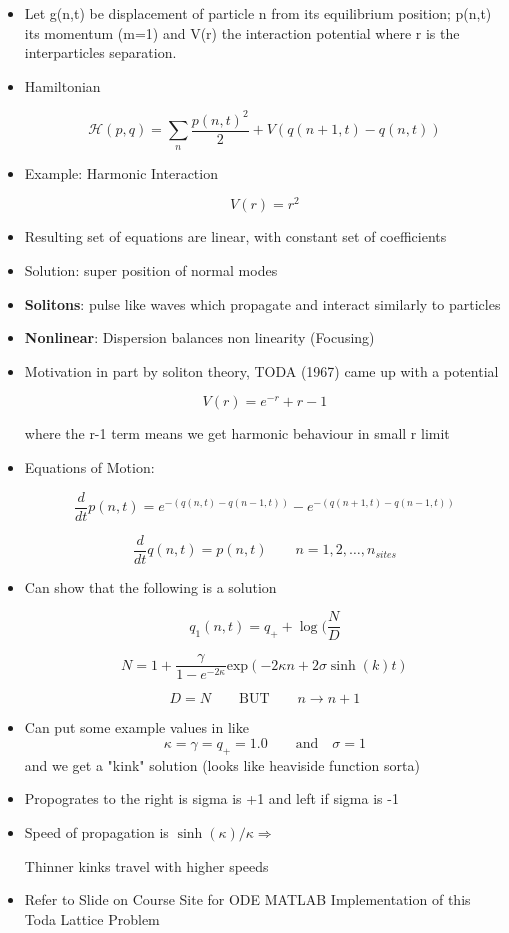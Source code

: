 \begin{itemize}
    \item Let g(n,t) be displacement of particle n from its equilibrium position; p(n,t) its momentum (m=1) and V(r) the interaction potential where r is the interparticles separation.

    \item Hamiltonian

    \[ \mathcal{H} (p,q) = \sum_n \frac{p(n,t)^2}{2} + V(q(n+1,t)-q(n,t))\]

    \item Example: Harmonic Interaction

    \[ V(r) = r^2\]

    \item Resulting set of equations are linear, with constant set of coefficients

    \item Solution: super position of normal modes

    \item \textbf{Solitons}: pulse like waves which propagate and interact similarly to particles
    \item \textbf{Nonlinear}: Dispersion balances non linearity (Focusing)
    \item Motivation in part by soliton theory, TODA (1967) came up with a potential 

    \[ V(r) = e^{-r} + r-1\]

    where the r-1 term means we get harmonic behaviour in small r limit

    \item Equations of Motion:

    \[ \frac{d}{dt} p(n,t) = e^{-(q(n,t)-q(n-1,t))}-e^{-(q(n+1,t)-q(n-1,t))}\]

    \[ \frac{d}{dt} q(n,t) = p(n,t) \qquad n=1,2,\ldots, n_{sites}\]

    \item Can show that the following is a solution

    \[ q_1(n,t) = q_+ + \log (\frac{N}{D}\]

    \[ N = 1+ \frac{\gamma}{1-e^{-2\kappa}} \text{exp}(-2\kappa n + 2 \sigma \sinh (k) t)\]

    \[ D = N \qquad \text{BUT} \qquad n\rightarrow n+1\]

    \item Can put some example values in like
    \[ \kappa = \gamma  = q_+ = 1.0 \qquad \text{and} \quad \sigma = 1\]
    and we get a "kink" solution (looks like heaviside function sorta)

    \item Propogrates to the right is sigma is +1 and left if sigma is -1

    \item Speed of propagation is $\sinh(\kappa)/\kappa \Rightarrow$

    Thinner kinks travel with higher speeds

    \item Refer to Slide on Course Site for ODE MATLAB Implementation of this Toda Lattice Problem
\end{itemize}


